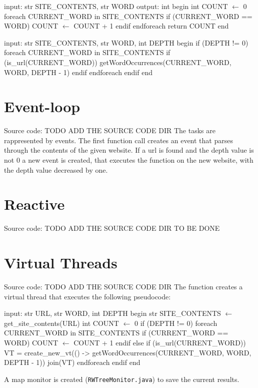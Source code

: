 \documentclass[12pt, a4paper]{report}
\begin{document}
\newpage

\begin{algorithm}[caption={countTask expressed in pseudocode}, label={alg1}]
input: str SITE_CONTENTS, str WORD
output: int
begin
    int COUNT $\gets$ 0
    foreach CURRENT_WORD in SITE_CONTENTS
        if (CURRENT_WORD == WORD)
            COUNT $\gets$ COUNT + 1
        endif
    endforeach
    return COUNT
end       
\end{algorithm}

\begin{algorithm}[caption={linkTask expressed in pseudocode}, label={alg2}]
input: str SITE_CONTENTS, str WORD, int DEPTH
begin
    if (DEPTH != 0)
        foreach CURRENT_WORD in SITE_CONTENTS
            if (is_url(CURRENT_WORD))
                getWordOccurrences(CURRENT_WORD, WORD, DEPTH - 1)
            endif
        endforeach
    endif
end       
\end{algorithm}
\section{Event-loop}
Source code: TODO ADD THE SOURCE CODE DIR
The tasks are rappresented by events. The first function call creates an event that parses through the contents of the given website.
 If a url is found and the depth value is not 0 a new event is created, that executes the function on the new website, with the depth value decreased by one.

\section{Reactive}
Source code: TODO ADD THE SOURCE CODE DIR
TO BE DONE
\section{Virtual Threads}
Source code: TODO ADD THE SOURCE CODE DIR
The function creates a virtual thread that executes the following pseudocode:

\newpage

\begin{algorithm}[label={alg3}]
input: str URL, str WORD, int DEPTH
begin
    str SITE_CONTENTS $\gets$ get_site_contents(URL)
    int COUNT $\gets$ 0
    if (DEPTH != 0)
        foreach CURRENT_WORD in SITE_CONTENTS
            if (CURRENT_WORD == WORD)
                COUNT $\gets$ COUNT + 1
            endif
            else if (is_url(CURRENT_WORD))
                VT = create_new_vt(() -> 
                    getWordOccurrences(CURRENT_WORD, WORD, DEPTH - 1))
                join(VT)
        endforeach
    endif
end       
\end{algorithm}

A map monitor is created (\texttt{RWTreeMonitor.java}) to save the current results.


\end{document}
